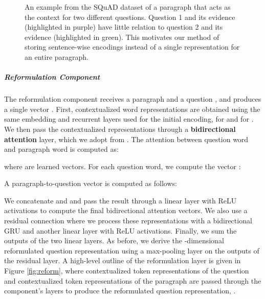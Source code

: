 \documentclass[11pt,a4paper,dvipsnames]{article}
\begin{document}
\begin{figure}[h]
\center
{}
\caption{An example from the SQuAD dataset of a paragraph that acts as the context for two different questions. Question 1 and its evidence (highlighted in \textcolor{RedViolet}{purple}) have little relation to question 2 and its evidence (highlighted in \textcolor{OliveGreen}{green}). This motivates our method of storing sentence-wise encodings instead of a single representation for an entire paragraph.}
\label{fig:sentence_level}
\end{figure}

\subparagraph{Reformulation Component}
The reformulation component receives a paragraph  and a question , and produces a single vector . First, contextualized word representations are obtained using the same embedding and recurrent layers used for the initial encoding,  for  and  for .
We then pass the contextualized representations through a \textbf{bidirectional attention} layer, which we adopt from \citet{GardnerC18snorm}.
The attention between question word  and paragraph word  is computed as:

where  are learned vectors. For each question word, we compute the vector :

A paragraph-to-question vector  is computed as follows:


We concatenate  and  and pass the result through a linear layer with ReLU activations to compute the final bidirectional attention vectors. We also use a residual connection where we process these representations with a bidirectional GRU and another linear layer with ReLU activations. Finally, we sum the outputs of the two linear layers. As before, we derive the -dimensional reformulated question representation  using a max-pooling layer on the outputs of the residual layer. A high-level outline of the reformulation layer is given in Figure \ref{fig:reform}, where  contextualized token representations of the question and  contextualized token representations of the paragraph are passed through the component's layers to produce the reformulated question representation, .
\end{document}
